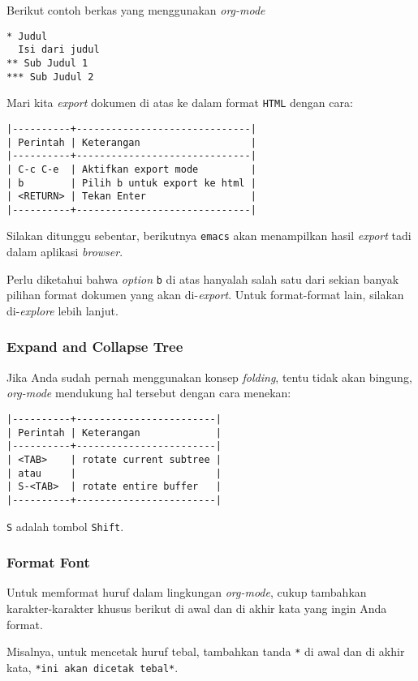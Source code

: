 \documentclass{article}
\begin{document}
Berikut contoh berkas yang menggunakan \emph{org-mode}

\begin{verbatim}
* Judul
  Isi dari judul
** Sub Judul 1
*** Sub Judul 2
\end{verbatim}

Mari kita \emph{export} dokumen di atas ke dalam format \verb=HTML= dengan cara:

\begin{verbatim}
|----------+------------------------------|
| Perintah | Keterangan                   |
|----------+------------------------------|
| C-c C-e  | Aktifkan export mode         |
| b        | Pilih b untuk export ke html |
| <RETURN> | Tekan Enter                  |
|----------+------------------------------|
\end{verbatim}

Silakan ditunggu sebentar, berikutnya \verb=emacs= akan menampilkan hasil
\emph{export} tadi dalam aplikasi \emph{browser}.

Perlu diketahui bahwa \emph{option} \verb=b= di atas hanyalah salah satu dari
sekian banyak pilihan format dokumen yang akan di-\emph{export}. Untuk 
format-format lain, silakan di-\emph{explore} lebih lanjut.

\subsubsection{Expand and Collapse Tree}
Jika Anda sudah pernah menggunakan konsep \emph{folding}, tentu tidak akan
bingung, \emph{org-mode} mendukung hal tersebut dengan cara menekan:

\begin{verbatim}
|----------+------------------------|
| Perintah | Keterangan             |
|----------+------------------------|
| <TAB>    | rotate current subtree |
| atau     |                        |
| S-<TAB>  | rotate entire buffer   |
|----------+------------------------|
\end{verbatim}

\verb=S= adalah tombol \verb=Shift=.

\subsubsection{Format Font}
Untuk memformat huruf dalam lingkungan \emph{org-mode}, cukup tambahkan
karakter-karakter khusus berikut di awal dan di akhir kata yang ingin 
Anda format.

Misalnya, untuk mencetak huruf tebal, tambahkan tanda \verb=*= di awal
dan di akhir kata, \verb=*ini akan dicetak tebal*=.
\end{document}
